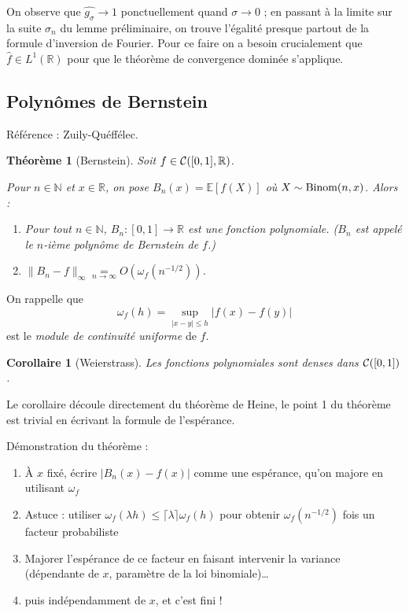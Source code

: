 \documentclass[a4paper, 11pt]{article}
\def\N{\mathbb{N}}
\def\R{\mathbb{R}}
\def\Cf{{\cal{C}}}
\def\E{\mathbb{E}}
\newtheorem*{theorem}{Théorème}
\newtheorem*{corollary}{Corollaire}
\begin{document}
On observe que $\widehat{g_\sigma} \longrightarrow 1$ ponctuellement quand
$\sigma \to 0$ ; en passant à la limite sur la suite $\sigma_n$ du lemme
préliminaire, on trouve l'égalité presque partout de la formule d'inversion de
Fourier. Pour ce faire on a besoin crucialement que $\hat{f} \in L^1(\R)$ pour
que le théorème de convergence dominée s'applique.


\subsection{Polynômes de Bernstein}

Référence : Zuily-Quéffélec.

\begin{theorem}[Bernstein]
  Soit $f \in \Cf([0,1], \R)$.
  
  Pour $n \in \N$ et $x \in \R$, on pose $B_n(x) = \E[f(X)]$ où $X \sim
  \textnormal{Binom}(n,x)$. Alors :
  \begin{enumerate}
  \item Pour tout $n \in \N$, $B_n : [0,1] \to \R$ est une fonction polynomiale.
    ($B_n$ est appelé le $n$-ième polynôme de Bernstein de $f$.)
  \item $\|B_n - f\|_\infty \underset{n \to \infty}{=} O\left(
      \omega_f(n^{-1/2}) \right)$.
  \end{enumerate}
\end{theorem}

On rappelle que
\[ \omega_f(h) = \sup_{|x-y| \leq h} |f(x) - f(y)| \]
est le \emph{module de continuité uniforme} de $f$.

\begin{corollary}[Weierstrass]
  Les fonctions polynomiales sont denses dans $\Cf([0,1])$.
\end{corollary}

Le corollaire découle directement du théorème de Heine, le point 1 du théorème
est trivial en écrivant la formule de l'espérance.

Démonstration du théorème :
\begin{enumerate}
\item À $x$ fixé, écrire $|B_n(x) - f(x)|$ comme une espérance, qu'on majore en
  utilisant $\omega_f$
\item Astuce : utiliser $\omega_f(\lambda h) \leq \lceil \lambda \rceil
  \omega_f(h)$ pour obtenir $\omega_f(n^{-1/2})$ fois un facteur probabiliste
\item Majorer l'espérance de ce facteur en faisant intervenir la variance
  (dépendante de $x$, paramètre de la loi binomiale)…
\item puis indépendamment de $x$, et c'est fini !
\end{enumerate}
\end{document}
